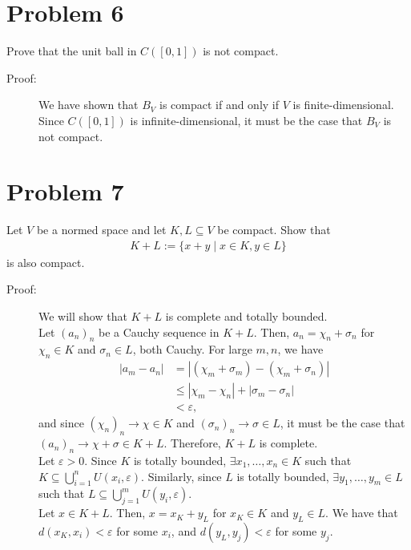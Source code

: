 \documentclass[10pt]{extarticle}
\begin{document}
  \section{Problem 6}%
  Prove that the unit ball in $C([0,1])$ is not compact.
  \begin{description}
    \item[Proof:] We have shown that $B_V$ is compact if and only if $V$ is finite-dimensional. Since $C([0,1])$ is infinite-dimensional, it must be the case that $B_V$ is not compact.
  \end{description}
  \section{Problem 7}%
  Let $V$ be a normed space and let $K,L\subseteq V$ be compact. Show that
  \begin{align*}
    K+L := \{x+y\mid x\in K,y\in L\}
  \end{align*}
  is also compact.
  \begin{description}
    \item[Proof:] We will show that $K+L$ is complete and totally bounded.\\

      Let $(a_n)_n$ be a Cauchy sequence in $K+L$. Then, $a_n = \chi_n + \sigma_n$  for $\chi_n\in K$ and $\sigma_n\in L$, both Cauchy. For large $m,n$, we have
      \begin{align*}
        |a_m - a_n| &= |(\chi_m + \sigma_m) - (\chi_m + \sigma_n)|\\
                    &\leq |\chi_m - \chi_n| + |\sigma_m - \sigma_n|\\
                    &< \varepsilon,
      \end{align*}
      and since $(\chi_n)_n \rightarrow \chi\in K$ and $(\sigma_n)_n\rightarrow \sigma \in L$, it must be the case that $(a_n)_n \rightarrow \chi + \sigma \in K+L$. Therefore, $K+L$ is complete.\\

      Let $\varepsilon > 0$. Since $K$ is totally bounded, $\exists x_1,\dots,x_n\in K$ such that $K\subseteq \bigcup_{i=1}^{n} U(x_i,\varepsilon)$. Similarly, since $L$ is totally bounded, $\exists y_1,\dots,y_m\in L$ such that $L\subseteq \bigcup_{j=1}^{m}U(y_i,\varepsilon)$.\\

      Let $x\in K+L$. Then, $x = x_K + y_L$ for $x_K\in K$ and $y_L\in L$. We have that $d(x_K,x_i) < \varepsilon$ for some $x_i$, and $d(y_L,y_j) < \varepsilon$ for some $y_j$.
  \end{description}
\end{document}

